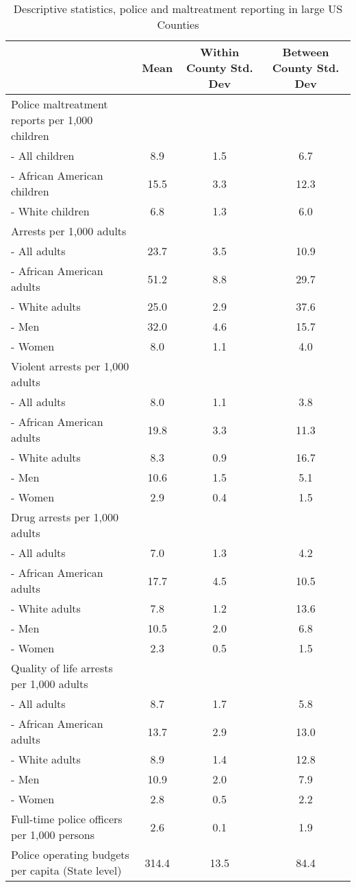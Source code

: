 \begin{table}[ht]
\centering
\caption{Descriptive statistics, police and maltreatment reporting in large US Counties} 
\label{desc3}
\begin{tabular}{lccc}
  \hline
  & Mean & Within County Std. Dev & Between County Std. Dev \\ 
  \hline
Police maltreatment reports per 1,000 children &  &  &  \\ 
         - All children & 8.9 & 1.5 & 6.7 \\ 
         - African American children & 15.5 & 3.3 & 12.3 \\ 
         - White children & 6.8 & 1.3 & 6.0 \\ 
  Arrests per 1,000 adults &  &  &  \\ 
         - All adults & 23.7 & 3.5 & 10.9 \\ 
         - African American adults & 51.2 & 8.8 & 29.7 \\ 
         - White adults & 25.0 & 2.9 & 37.6 \\ 
         - Men & 32.0 & 4.6 & 15.7 \\ 
         - Women & 8.0 & 1.1 & 4.0 \\ 
  Violent arrests per 1,000 adults &  &  &  \\ 
         - All adults & 8.0 & 1.1 & 3.8 \\ 
         - African American adults & 19.8 & 3.3 & 11.3 \\ 
         - White adults & 8.3 & 0.9 & 16.7 \\ 
         - Men & 10.6 & 1.5 & 5.1 \\ 
         - Women & 2.9 & 0.4 & 1.5 \\ 
  Drug arrests per 1,000 adults &  &  &  \\ 
         - All adults & 7.0 & 1.3 & 4.2 \\ 
         - African American adults & 17.7 & 4.5 & 10.5 \\ 
         - White adults & 7.8 & 1.2 & 13.6 \\ 
         - Men & 10.5 & 2.0 & 6.8 \\ 
         - Women & 2.3 & 0.5 & 1.5 \\ 
  Quality of life arrests per 1,000 adults &  &  &  \\ 
         - All adults & 8.7 & 1.7 & 5.8 \\ 
         - African American adults & 13.7 & 2.9 & 13.0 \\ 
         - White adults & 8.9 & 1.4 & 12.8 \\ 
         - Men & 10.9 & 2.0 & 7.9 \\ 
         - Women & 2.8 & 0.5 & 2.2 \\ 
  Full-time police officers per 1,000 persons & 2.6 & 0.1 & 1.9 \\ 
  Police operating budgets per capita (State level) & 314.4 & 13.5 & 84.4 \\ 
   \hline
\end{tabular}
\end{table}

